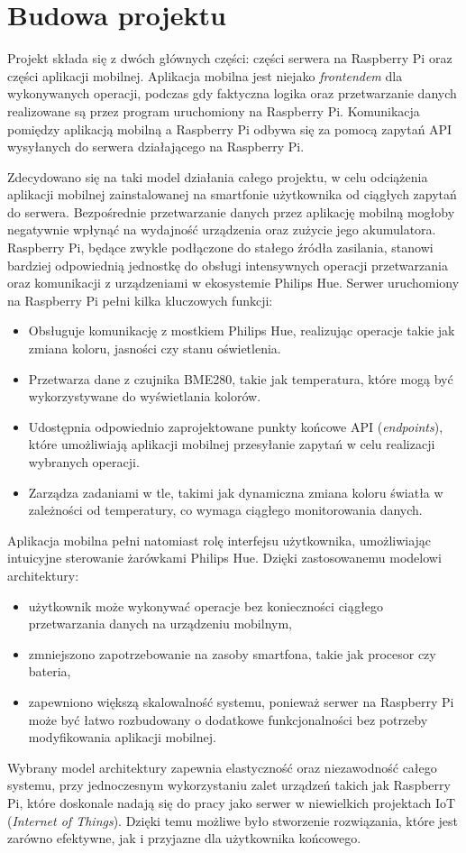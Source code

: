 \documentclass[12pt]{article}
\begin{document}
\clearpage


\section{Budowa projektu}
Projekt składa się z dwóch głównych części: części serwera na Raspberry Pi oraz części aplikacji mobilnej. Aplikacja mobilna jest niejako \textit{frontendem}
dla wykonywanych operacji, podczas gdy faktyczna logika oraz przetwarzanie danych realizowane są przez program uruchomiony na Raspberry Pi. Komunikacja pomiędzy aplikacją
mobilną a Raspberry Pi odbywa się za pomocą zapytań API wysyłanych do serwera działającego na Raspberry Pi.

Zdecydowano się na taki model działania całego projektu, w celu odciążenia aplikacji mobilnej zainstalowanej na smartfonie użytkownika od ciągłych zapytań do serwera.
Bezpośrednie przetwarzanie danych przez aplikację mobilną mogłoby negatywnie wpłynąć na wydajność urządzenia oraz zużycie jego akumulatora. Raspberry Pi, będące zwykle
podłączone do stałego źródła zasilania, stanowi bardziej odpowiednią jednostkę do obsługi intensywnych operacji przetwarzania oraz komunikacji z urządzeniami w ekosystemie Philips Hue.
Serwer uruchomiony na Raspberry Pi pełni kilka kluczowych funkcji:
\begin{itemize}
    \item Obsługuje komunikację z mostkiem Philips Hue, realizując operacje takie jak zmiana koloru, jasności czy stanu oświetlenia.
    \item Przetwarza dane z czujnika BME280, takie jak temperatura, które mogą być wykorzystywane do wyświetlania kolorów.
    \item Udostępnia odpowiednio zaprojektowane punkty końcowe API (\textit{endpoints}), które umożliwiają aplikacji mobilnej przesyłanie zapytań w celu realizacji wybranych operacji.
    \item Zarządza zadaniami w tle, takimi jak dynamiczna zmiana koloru światła w zależności od temperatury, co wymaga ciągłego monitorowania danych.
\end{itemize}
Aplikacja mobilna pełni natomiast rolę interfejsu użytkownika, umożliwiając intuicyjne sterowanie żarówkami Philips Hue. Dzięki zastosowanemu modelowi architektury:
\begin{itemize}
    \item użytkownik może wykonywać operacje bez konieczności ciągłego przetwarzania danych na urządzeniu mobilnym,
    \item zmniejszono zapotrzebowanie na zasoby smartfona, takie jak procesor czy bateria,
    \item zapewniono większą skalowalność systemu, ponieważ serwer na Raspberry Pi może być łatwo rozbudowany o dodatkowe funkcjonalności bez potrzeby modyfikowania aplikacji mobilnej.
\end{itemize}
Wybrany model architektury zapewnia elastyczność oraz niezawodność całego systemu, przy jednoczesnym wykorzystaniu zalet urządzeń takich jak Raspberry Pi, które doskonale nadają się do pracy jako serwer w niewielkich projektach IoT (\textit{Internet of Things}). Dzięki temu możliwe było stworzenie rozwiązania, które jest zarówno efektywne, jak i przyjazne dla użytkownika końcowego.
\end{document}
